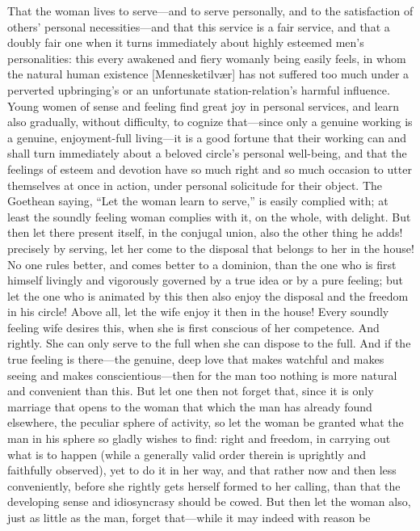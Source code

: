 \documentclass[12pt,a4paper]{book}
\begin{document}
That the woman lives to serve---and to serve personally, and to the
satisfaction of others' personal necessities---and that this service is a
fair service, and that a doubly fair one when it turns immediately about
highly esteemed men's personalities: this every awakened and fiery womanly
being easily feels, in whom the natural human existence [Mennesketilvær] has
not suffered too much under a perverted upbringing's or an unfortunate
station-relation's harmful influence. Young women of sense and feeling find
great joy in personal services, and learn also gradually, without
difficulty, to cognize that---since only a genuine working is a genuine,
enjoyment-full living---it is a good fortune that their working can and
shall turn immediately about a beloved circle's personal well-being, and
that the feelings of esteem and devotion have so much right and so much
occasion to utter themselves at once in action, under personal solicitude
for their object. The Goethean saying, ``Let the woman learn to serve,'' is
easily complied with; at least the soundly feeling woman complies with it,
on the whole, with delight. But then let there present itself, in the
conjugal union, also the other thing he adds! precisely by serving, let her
come to the disposal that belongs to her in the house! No one rules better,
and comes better to a dominion, than the one who is first himself livingly
and vigorously governed by a true idea or by a pure feeling; but let the
one who is animated by this then also enjoy the disposal and the freedom in
his circle! Above all, let the wife enjoy it then in the house! Every
soundly feeling wife desires this, when she is first conscious of her
competence. And rightly. She can only serve to the full when she can
dispose to the full. And if the true feeling is there---the genuine, deep
love that makes watchful and makes seeing and makes conscientious---then for
the man too nothing is more natural and convenient than this. But let one
then not forget that, since it is only marriage that opens to the woman
that which the man has already found elsewhere, the peculiar sphere of
activity, so let the woman be granted what the man in his sphere so gladly
wishes to find: right and freedom, in carrying out what is to happen (while
a generally valid order therein is uprightly and faithfully observed), yet
to do it in her way, and that rather now and then less conveniently, before
she rightly gets herself formed to her calling, than that the developing
sense and idiosyncrasy should be cowed. But then let the woman also, just
as little as the man, forget that---while it may indeed with reason be
\end{document}
